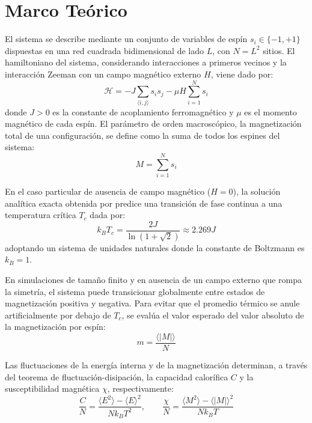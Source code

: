 \section{Marco Teórico}
El sistema se describe mediante un conjunto de variables de espín $s_i \in \{-1, +1\}$ dispuestas en una red cuadrada bidimensional de lado $L$, con $N = L^2$ sitios. El hamiltoniano del sistema, considerando interacciones a primeros vecinos y la interacción Zeeman con un campo magnético externo $H$, viene dado por:
\begin{equation}
    \mathcal{H} = -J \sum_{\langle i,j \rangle} s_i s_j - \mu H \sum_{i=1}^N s_i
\end{equation}
donde $J>0$ es la constante de acoplamiento ferromagnético y $\mu$ es el momento magnético de cada espín. El parámetro de orden macroscópico, la magnetización total de una configuración, se define como la suma de todos los espines del sistema: 
\begin{equation}
    M = \sum_{i=1}^N s_i
\end{equation}

En el caso particular de ausencia de campo magnético ($H = 0$), la solución analítica exacta obtenida por \citet{PhysRev.65.117} predice una transición de fase continua a una temperatura crítica $T_c$ dada por:
\begin{equation}
    k_B T_c = \frac{2J}{\ln(1+\sqrt{2})} \approx 2.269 J
\end{equation}
adoptando un sistema de unidades naturales donde la constante de Boltzmann es $k_B = 1$. 

En simulaciones de tamaño finito y en ausencia de un campo externo que rompa la simetría, el sistema puede transicionar globalmente entre estados de magnetización positiva y negativa. Para evitar que el promedio térmico se anule artificialmente por debajo de $T_c$, se evalúa el valor esperado del valor absoluto de la magnetización por espín:
\begin{equation}
    m = \frac{\langle |M| \rangle}{N}
\end{equation}

Las fluctuaciones de la energía interna y de la magnetización determinan, a través del teorema de fluctuación-disipación, la capacidad calorífica $C$ y la susceptibilidad magnética $\chi$, respectivamente:
\begin{equation}
    \frac{C}{N} = \frac{\langle E^2 \rangle - \langle E \rangle^2}{N k_B T^2}, \quad \quad \frac{\chi}{N} = \frac{\langle M^2 \rangle - \langle |M| \rangle^2}{N k_B T}
\end{equation}

